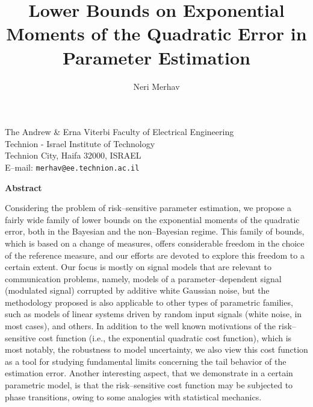 \documentclass[11pt,epsf]{article}
\begin{document}
\thispagestyle{empty}
\title{Lower Bounds on Exponential Moments of the Quadratic Error in Parameter
Estimation}
\author{Neri Merhav
}
\date{}
\maketitle

\begin{center}
The Andrew \& Erna Viterbi Faculty of Electrical Engineering\\
Technion - Israel Institute of Technology \\
Technion City, Haifa 32000, ISRAEL \\
E--mail: {\tt merhav@ee.technion.ac.il}\\
\end{center}
\vspace{1.5\baselineskip}
\setlength{\baselineskip}{1.5\baselineskip}

\begin{center}
{\bf Abstract}
\end{center}
\setlength{\baselineskip}{0.5\baselineskip}
Considering the problem of risk--sensitive parameter estimation, we propose
a fairly wide family of lower bounds on the exponential moments of the quadratic error, both
in the Bayesian and the non--Bayesian regime. This family of bounds, which is based on a change
of measures, offers considerable freedom in the choice of the reference
measure, and our efforts are devoted to explore this freedom to a certain
extent. Our focus is mostly on signal
models that are relevant to communication problems, namely, 
models of a parameter--dependent signal 
(modulated signal) corrupted by additive white Gaussian noise, but
the methodology proposed is also applicable to other types of parametric families,
such as models of linear systems driven by random input signals (white noise,
in most cases), and others.
In addition to the well known motivations of the risk--sensitive cost
function (i.e., the exponential quadratic cost function), 
which is most notably, the robustness to
model uncertainty, we also view this cost function as a tool for studying
fundamental limits concerning the tail behavior of the estimation error. 
Another interesting aspect, that we demonstrate
in a certain parametric model, is that the risk--sensitive
cost function may be subjected to phase transitions, 
owing to some analogies with statistical mechanics.\\
\end{document}
